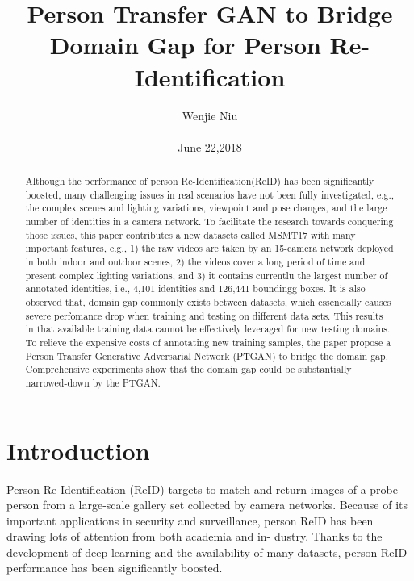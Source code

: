 \documentclass[10pt,twocolumn,letterpaper]{article}
\begin{document}
\title{Person Transfer GAN to Bridge Domain Gap for Person Re-Identification}

\author{Wenjie Niu\\\\ June 22,2018}

\maketitle

\begin{abstract}
Although the performance of person Re-Identification(ReID) has been significantly boosted, many challenging issues in real scenarios have not been fully investigated, e.g., the complex scenes and lighting variations, viewpoint and pose changes, and the large number of identities in a camera network. To  facilitate the research towards conquering those issues, this paper contributes a new datasets called MSMT17 with many important features, e.g., 1) the raw videos are taken by an 15-camera network deployed in both indoor and outdoor scenes, 2) the videos cover a long period of time and present complex lighting variations, and 3) it contains currentlu the largest number of annotated identities, i.e., 4,101 identities and 126,441 boundingg boxes. It is also observed that, domain gap commonly exists between datasets, which essencially causes severe perfomance drop when training and testing on different data sets. This results in that available training data cannot be effectively
leveraged for new testing domains. To relieve the expensive
costs of annotating new training samples, the paper propose a Person Transfer Generative Adversarial Network (PTGAN) to
bridge the domain gap. Comprehensive experiments show
that the domain gap could be substantially narrowed-down
by the PTGAN.\cite{Wei_2018_CVPR}\par
\end{abstract}

\section{Introduction}
Person Re-Identification (ReID) targets to match and return images of a probe person from a large-scale gallery
set collected by camera networks. Because of its important
applications in security and surveillance, person ReID has
been drawing lots of attention from both academia and in-
dustry. Thanks to the development of deep learning and the
availability of many datasets, person ReID performance has
been significantly boosted.\par
\end{document}

